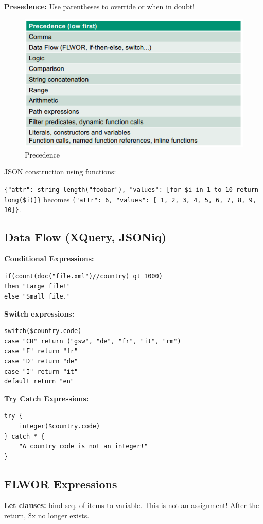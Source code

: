 \documentclass[11pt,oneside,a4paper]{article}
\begin{document}
{\textbf{Presedence:} Use parentheses to override or when in doubt!

\begin{figure}[hb!]
	\centering
	\includegraphics[width=0.4\linewidth]{figures/querytrees_precedence}
	\caption{Precedence}
	\label{fig:querytreesprecedence}
\end{figure}

JSON construction using functions:

\texttt{\{"attr": string-length("foobar"), "values": [for \$i in 1 to 10 return long(\$i)]\}} becomes \texttt{\{"attr": 6, "values": [ 1, 2, 3, 4, 5, 6, 7, 8, 9, 10]\}}.


\subsection{Data Flow (XQuery, JSONiq)}

\textbf{Conditional Expressions:}
\begin{lstlisting}
if(count(doc("file.xml")//country) gt 1000)
then "Large file!"
else "Small file."
\end{lstlisting}

\textbf{Switch expressions:}

\begin{lstlisting}
switch($country.code)
case "CH" return ("gsw", "de", "fr", "it", "rm")
case "F" return "fr"
case "D" return "de"
case "I" return "it"
default return "en"
\end{lstlisting}

\textbf{Try Catch Expressions:}

\begin{lstlisting}
try {
	integer($country.code)
} catch * {
	"A country code is not an integer!"
}
\end{lstlisting}


\subsection{FLWOR Expressions}

\textbf{Let clauses:} bind seq. of items to variable. This is not an assignment! After the return, \$x no longer exists.

}
\end{document}
